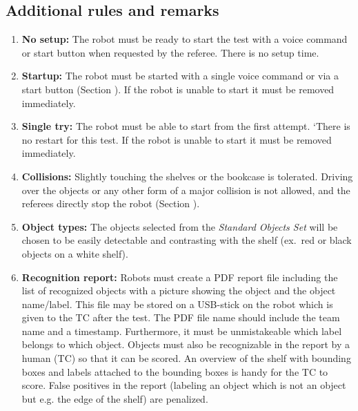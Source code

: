 \subsection{Additional rules and remarks}
\begin{enumerate}
\item \textbf{No setup:} The robot must be ready to start the test with a voice command or start button when requested by the referee. There is no setup time.
\item \textbf{Startup:} The robot must be started with a single voice command or via a start button (Section ). If the robot is unable to start it must be removed immediately.
\item \textbf{Single try:} The robot must be able to start from the first attempt. 
`There is no restart for this test. If the robot is unable to start it must be removed immediately.
\item \textbf{Collisions:} Slightly touching the shelves or the bookcase is tolerated. 
  Driving over the objects or any other form of a major collision is not allowed, and the referees directly stop the robot (Section ).
\item \textbf{Object types:} The objects selected from the \textit{Standard Objects Set} will be chosen to be easily detectable and contrasting with the shelf (ex.~red or black objects on a white shelf).
\item \textbf{Recognition report:} Robots must create a PDF report file including the list of recognized objects with a picture showing the object and the object name/label.
  This file may be stored on a USB-stick on the robot which is given to the TC after the test. The PDF file name should include the team name and a timestamp. 
  Furthermore, it must be unmistakeable which label belongs to which object. Objects must also be recognizable in the report by a human (TC) so that it can be scored. 
  An overview of the shelf with bounding boxes and labels attached to the bounding boxes is handy for the TC to score.
  False positives in the report (labeling an object which is not an object but e.g. the edge of the shelf) are penalized.
\end{enumerate}

